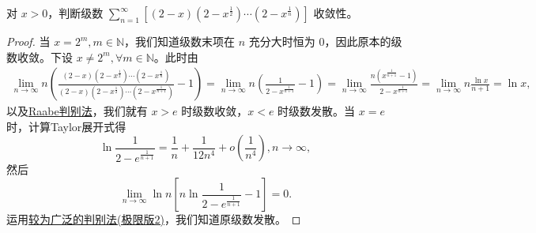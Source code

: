 \documentclass[../../main.tex]{subfiles}%
\begin{document}
\begin{example}
对 \( x > 0 \)，判断级数 \( \sum_{n = 1}^{\infty} \left[ (2 - x) \left( 2 - x^{\frac{1}{2}} \right) \cdots \left( 2 - x^{\frac{1}{n}} \right) \right] \) 收敛性。
\end{example}
\begin{proof}
当 \( x = 2^m, m \in \mathbb{N} \)，我们知道级数末项在 \( n \) 充分大时恒为 0，因此原本的级数收敛。下设 \( x \neq 2^m, \forall m \in \mathbb{N} \)。此时由
\begin{align*}
\lim_{n \to \infty} n \left( \frac{(2 - x) \left( 2 - x^{\frac{1}{2}} \right) \cdots \left( 2 - x^{\frac{1}{n}} \right)}{(2 - x) \left( 2 - x^{\frac{1}{2}} \right) \cdots \left( 2 - x^{\frac{1}{n + 1}} \right)} - 1 \right) = \lim_{n \to \infty} n \left( \frac{1}{2 - x^{\frac{1}{n + 1}}} - 1 \right)= \lim_{n \to \infty} \frac{n \left( x^{\frac{1}{n + 1}} - 1 \right)}{2 - x^{\frac{1}{n + 1}}} = \lim_{n \to \infty} n \frac{\ln x}{n + 1} = \ln x,
\end{align*}
以及\hyperref[theorem:Raabe(拉比)判别法]{Raabe判别法}，我们就有 \( x > e \) 时级数收敛，\( x < e \) 时级数发散。当 \( x = e \) 时，计算Taylor展开式得
\[
\ln \frac{1}{2 - e^{\frac{1}{n + 1}}} = \frac{1}{n} + \frac{1}{12 n^4} + o \left( \frac{1}{n^4} \right), n \to \infty,
\]
然后
\[
\lim_{n \to \infty} \ln n \left[ n \ln \frac{1}{2 - e^{\frac{1}{n + 1}}} - 1 \right] = 0.
\]
运用\hyperref[theorem:较为广泛的判别法]{较为广泛的判别法(极限版2)}，我们知道原级数发散。
\end{proof}
\end{document}
